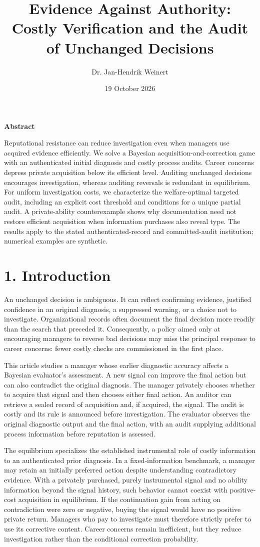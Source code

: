 \documentclass[
  11pt,
]{article}
\title{Evidence Against Authority: Costly Verification and the Audit of
Unchanged Decisions}
\author{Dr. Jan-Hendrik Weinert}
\date{19 October 2026}
\makeatletter
\renewcommand{\maketitle}{%
  \begin{center}
  {\LARGE\bfseries\@title\par}
  \vspace{0.8em}
  {\normalsize\@author\par}
  \vspace{0.35em}
  {\small\@date\par}
  \end{center}
  \vspace{0.4em}}
\renewenvironment{abstract}{%
  \begin{center}\small\bfseries Abstract\end{center}
  \begin{list}{}{\setlength{\leftmargin}{0.5in}\setlength{\rightmargin}{0.5in}}
  \item[]\small\setlength{\parindent}{0pt}\ignorespaces
}{\end{list}\vspace{0.6em}}
\makeatother
\begin{document}
\maketitle
\begin{abstract}
Reputational resistance can reduce investigation even when managers use acquired evidence efficiently. We solve a Bayesian acquisition-and-correction game with an authenticated initial diagnosis and costly process audits. Career concerns depress private acquisition below its efficient level. Auditing unchanged decisions encourages investigation, whereas auditing reversals is redundant in equilibrium. For uniform investigation costs, we characterize the welfare-optimal targeted audit, including an explicit cost threshold and conditions for a unique partial audit. A private-ability counterexample shows why documentation need not restore efficient acquisition when information purchases also reveal type. The results apply to the stated authenticated-record and committed-audit institution; numerical examples are synthetic.
\end{abstract}
\section{1. Introduction}\label{introduction}

An unchanged decision is ambiguous. It can reflect confirming evidence,
justified confidence in an original diagnosis, a suppressed warning, or
a choice not to investigate. Organizational records often document the
final decision more readily than the search that preceded it.
Consequently, a policy aimed only at encouraging managers to reverse bad
decisions may miss the principal response to career concerns: fewer
costly checks are commissioned in the first place.

This article studies a manager whose earlier diagnostic accuracy affects
a Bayesian evaluator's assessment. A new signal can improve the final
action but can also contradict the original diagnosis. The manager
privately chooses whether to acquire that signal and then chooses either
final action. An auditor can retrieve a sealed record of acquisition
and, if acquired, the signal. The audit is costly and its rule is
announced before investigation. The evaluator observes the original
diagnostic output and the final action, with an audit supplying
additional process information before reputation is assessed.

The equilibrium specializes the established instrumental role of costly
information to an authenticated prior diagnosis. In a fixed-information
benchmark, a manager may retain an initially preferred action despite
understanding contradictory evidence. With a privately purchased, purely
instrumental signal and no ability information beyond the signal
history, such behavior cannot coexist with positive-cost acquisition in
equilibrium. If the continuation gain from acting on contradiction were
zero or negative, buying the signal would have no positive private
return. Managers who pay to investigate must therefore strictly prefer
to use its corrective content. Career concerns remain inefficient, but
they reduce investigation rather than the conditional correction
probability.
\end{document}
